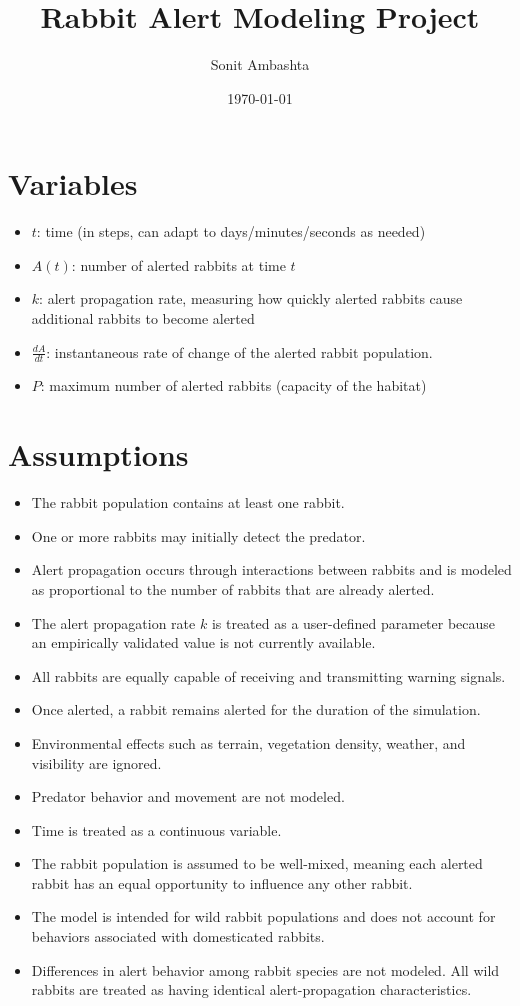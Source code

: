 \documentclass{article}
\title{Rabbit Alert Modeling Project}
\author{Sonit Ambashta}
\date{\today}
\begin{document}
\maketitle

\section{Variables}
\begin{itemize}
    \item $t$: time (in steps, can adapt to days/minutes/seconds as needed)
    \item $A(t)$: number of alerted rabbits at time $t$
    \item $k$: alert propagation rate, measuring how quickly alerted rabbits cause additional rabbits to become alerted
    \item $\frac{dA}{dt}$: instantaneous rate of change of the alerted rabbit population.
    \item $P$: maximum number of alerted rabbits (capacity of the habitat)
\end{itemize}

\section{Assumptions}
\begin{itemize}
\item The rabbit population contains at least one rabbit. 
\item One or more rabbits may initially detect the predator. 
\item Alert propagation occurs through interactions between rabbits and is modeled as proportional to the number of rabbits that are already alerted. 
\item The alert propagation rate $k$ is treated as a user-defined parameter because an empirically validated value is not currently available. 
\item All rabbits are equally capable of receiving and transmitting warning signals. 
\item Once alerted, a rabbit remains alerted for the duration of the simulation. 
\item Environmental effects such as terrain, vegetation density, weather, and visibility are ignored. 
\item Predator behavior and movement are not modeled. 
\item Time is treated as a continuous variable. 
\item The rabbit population is assumed to be well-mixed, meaning each alerted rabbit has an equal opportunity to influence any other rabbit.
\item The model is intended for wild rabbit populations and does not account for behaviors associated with domesticated rabbits.
\item Differences in alert behavior among rabbit species are not modeled. All wild rabbits are treated as having identical alert-propagation characteristics.
\end{itemize}
\end{document}
